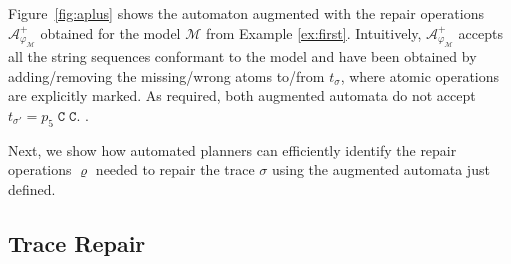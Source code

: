 Figure~\ref{fig:aplus} shows the automaton augmented with the repair operations $\mathcal{A}_{\varphi_{\mathcal{M}}}^+$ obtained for the model $\mathcal{M}$ from Example \ref{ex:first}. Intuitively, $\mathcal{A}_{\varphi_{\mathcal{M}}}^+$ accepts all the string sequences conformant to the model and have been obtained by adding/removing the missing/wrong atoms to/from $t_\sigma$, where atomic operations are explicitly marked. As required, both augmented automata do not accept $t_{\sigma'}=p_5\;\texttt{C}\;\texttt{C}$. .

Next, we show how automated planners can efficiently identify the repair operations $\varrho$ needed to repair the trace $\sigma$ using the augmented automata just defined.




\subsection{Trace Repair}\label{ssec:trerepair}


